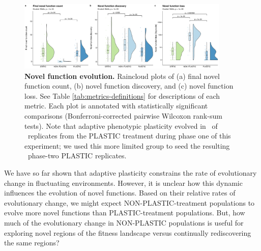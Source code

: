\documentclass[utf8]{frontiersSCNS} %
\begin{document}
\begin{raggedbottom}
\begin{figure}[h!]
  \centering
  \includegraphics[width=0.9\textwidth]{media-complex-traits-magnitude-panel.pdf}
  \caption{\small
  \textbf{Novel function evolution.}
  Raincloud plots of
  (a) final novel function count,
  (b) novel function discovery,
  and (c) novel function loss.
  See Table \ref{tab:metrics-definitions} for descriptions of each metric.
  Each plot is annotated with statistically significant comparisons (Bonferroni-corrected pairwise Wilcoxon rank-sum tests).
  Note that adaptive phenotypic plasticity evolved in \novelTraitsPlasticReps\ of \novelTraitsReplicates\ replicates from the PLASTIC treatment during phase one of this experiment; we used this more limited group to seed the resulting \novelTraitsPlasticReps\ phase-two PLASTIC replicates.
  }
  \label{fig:complex-traits-magnitude}
\end{figure}

We have so far shown that adaptive plasticity constrains the rate of evolutionary change in fluctuating environments.
However, it is unclear how this dynamic influences the evolution of novel functions.
Based on their relative rates of evolutionary change, we might expect NON-PLASTIC-treatment populations to evolve more novel functions than PLASTIC-treatment populations.
But, how much of the evolutionary change in NON-PLASTIC populations is useful for exploring novel regions of the fitness landscape versus continually rediscovering the same regions?


\end{raggedbottom}
\end{document}

